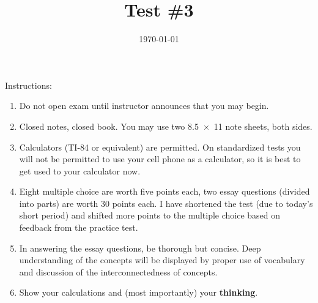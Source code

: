 \documentclass[exam,addpoints, answers]{exam}
\title{Test \#3}
\date{\today}
\author{\mobeardInstructorShort}
\begin{document}
\maketitle
\vfill
\mobeardExamNameBlock
\vfill
Instructions: 
\begin{enumerate}
\item Do not open exam until instructor announces that you may begin.
\item Closed notes, closed book.  You may use two \SI{8.5x11}{\inch} note sheets, both sides. 
\item Calculators (TI-84 or equivalent) are permitted.  On standardized tests you will not be permitted to use your cell phone as a calculator, so it is best to get used to your calculator now. 
\item Eight multiple choice are worth five points each, two essay questions (divided into parts) are worth 30 points each.  I have shortened the test (due to today's short period) and shifted more points to the multiple choice based on feedback from the practice test. 
\item In answering the essay questions, be thorough but concise. Deep understanding of the concepts will be displayed by proper use of vocabulary and discussion of the interconnectedness of concepts. 
\item Show your calculations and (most importantly) your \textbf{thinking}.
\end{enumerate}
\vfill
\begin{center}
\gradetable[h][questions]
\end{center}
\clearpage
\end{document}
